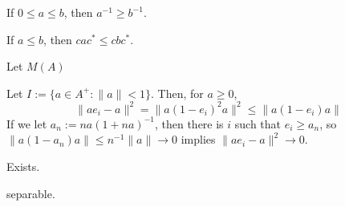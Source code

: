 \documentclass{../../large}
\begin{document}
\begin{prb}
\begin{parts}
\item If $0\le a\le b$, then $a^{-1}\ge b^{-1}$.
\item If $a\le b$, then $cac^*\le cbc^*$.
\end{parts}
\end{prb}





\begin{prb}
Let $M(A)$


Let $I:=\{a\in A^+:\|a\|<1\}$.
Then,
for $a\ge0$,
\[\|ae_i-a\|^2=\|a(1-e_i)^2a\|^2\le\|a(1-e_i)a\|\]
If we let $a_n:=na(1+na)^{-1}$, then there is $i$ such that $e_i\ge a_n$, so $\|a(1-a_n)a\|\le n^{-1}\|a\|\to0$ implies $\|ae_i-a\|^2\to0$.

\begin{parts}
\item Exists.
\item 
\item 
\item separable.
\end{parts}
\end{prb}
\end{document}
